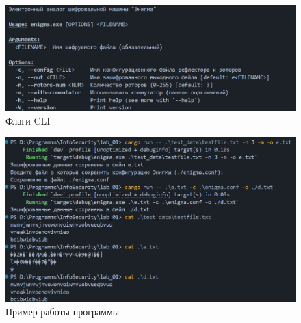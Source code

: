 \begin{figure}[h]
    \centering
    \includegraphics[width=1\linewidth]{images/prog_ex.png}
    \caption{Флаги CLI}
    \label{fig:prog}
\end{figure}

\begin{figure}[h]
    \centering
    \includegraphics[width=1\linewidth]{images/image.png}
    \caption{Пример работы программы}
    \label{fig:prog}
\end{figure}





